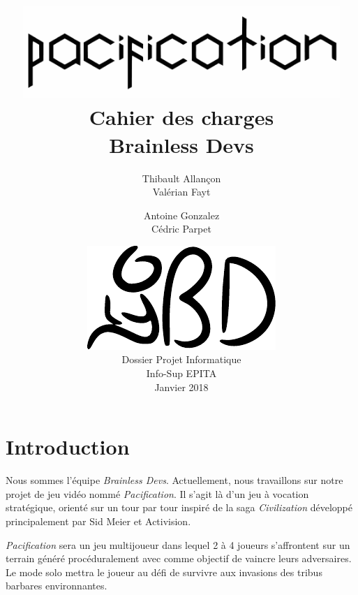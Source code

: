 \documentclass[12pt]{report}
\begin{document}
\title{
	{\vspace{3em}\protect\centering\protect\includegraphics[width=0.9\textwidth]{pacification_vector.pdf}}\\
	{\vspace{4em}\Huge Cahier des charges}\\
	{\large Brainless Devs}
}
\author{
	Thibault Allançon\\
	Valérian Fayt
	\and
	Antoine Gonzalez\\
	Cédric Parpet}
\date{
	{\vfill\protect\centering\protect\includegraphics{logo_short_vector.pdf}}\\
	Dossier Projet Informatique\\
	Info-Sup EPITA\\
	Janvier 2018
}

\maketitle
\tableofcontents

\chapter{Introduction}

Nous sommes l’équipe \textit{Brainless Devs}. Actuellement, nous travaillons sur notre projet de jeu vidéo nommé \textit{Pacification}. Il s'agit là d'un jeu à vocation stratégique, orienté sur un tour par tour inspiré de la saga \textit{Civilization} développé principalement par Sid Meier et Activision.

\textit{Pacification} sera un jeu multijoueur dans lequel 2 à 4 joueurs s'affrontent sur un terrain généré procéduralement avec comme objectif de vaincre leurs adversaires. Le mode solo mettra le joueur au défi de survivre aux invasions des tribus barbares environnantes.
\end{document}
